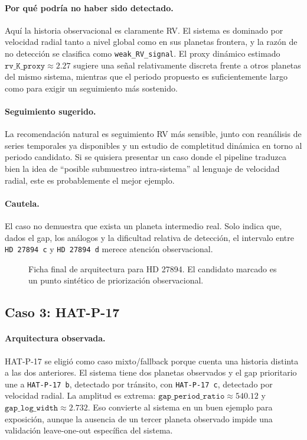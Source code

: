 \paragraph{Por qu\'e podr\'ia no haber sido detectado.}
Aqu\'i la historia observacional es claramente RV. El sistema es dominado por velocidad radial tanto a nivel global como en sus planetas frontera, y la raz\'on de no detecci\'on se clasifica como \texttt{weak\_RV\_signal}. El proxy din\'amico estimado \(\texttt{rv\_K\_proxy}\approx 2.27\) sugiere una se\~nal relativamente discreta frente a otros planetas del mismo sistema, mientras que el periodo propuesto es suficientemente largo como para exigir un seguimiento m\'as sostenido.

\paragraph{Seguimiento sugerido.}
La recomendaci\'on natural es seguimiento RV m\'as sensible, junto con rean\'alisis de series temporales ya disponibles y un estudio de completitud din\'amica en torno al periodo candidato. Si se quisiera presentar un caso donde el pipeline traduzca bien la idea de ``posible submuestreo intra-sistema'' al lenguaje de velocidad radial, este es probablemente el mejor ejemplo.

\paragraph{Cautela.}
El caso no demuestra que exista un planeta intermedio real. Solo indica que, dados el gap, los an\'alogos y la dificultad relativa de detecci\'on, el intervalo entre \texttt{HD 27894 c} y \texttt{HD 27894 d} merece atenci\'on observacional.

\begin{figure}[H]
\centering
{}
\caption{Ficha final de arquitectura para HD 27894. El candidato marcado es un punto sint\'etico de priorizaci\'on observacional.}
\label{fig:final-hd27894}
\end{figure}

\subsection{Caso 3: HAT-P-17}

\paragraph{Arquitectura observada.}
HAT-P-17 se eligi\'o como caso mixto/fallback porque cuenta una historia distinta a las dos anteriores. El sistema tiene dos planetas observados y el gap prioritario une a \texttt{HAT-P-17 b}, detectado por tr\'ansito, con \texttt{HAT-P-17 c}, detectado por velocidad radial. La amplitud es extrema: \(\texttt{gap\_period\_ratio}\approx 540.12\) y \(\texttt{gap\_log\_width}\approx 2.732\). Eso convierte al sistema en un buen ejemplo para exposici\'on, aunque la ausencia de un tercer planeta observado impide una validaci\'on leave-one-out espec\'ifica del sistema.


